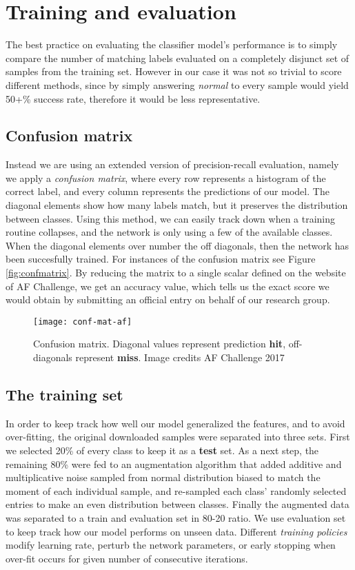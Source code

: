 \chapter{Training and evaluation}

The best practice on evaluating the classifier model's performance is to simply compare the number of matching labels evaluated on a completely disjunct set of samples from the training set.
However in our case it was not so trivial to score different methods, since by simply answering \textit{normal} to every sample would yield 50+\% success rate, therefore it would be less representative.

\section{Confusion matrix}
Instead we are using an extended version of precision-recall evaluation, namely we apply a \textit{confusion matrix}, where every row represents a histogram of the correct label, and every column represents the predictions of our model. The diagonal elements show how many labels match, but it preserves the distribution between classes.
Using this method, we can easily track down when a training routine collapses, and the network is only using a few of the available classes. When the diagonal elements over number the off diagonals, then the network has been succesfully trained. For instances of the confusion matrix see Figure \ref{fig:confmatrix}.
By reducing the matrix to a single scalar defined on the website of AF Challenge, we get an accuracy value, which tells us the exact score we would obtain by submitting an official entry on behalf of our research group.

\begin{figure}
  \centering
  \texttt{[image: conf-mat-af]}\label{fig:FCN}
  \caption{Confusion matrix. Diagonal values represent prediction \textbf{hit}, off-diagonals represent \textbf{miss}. Image credits AF Challenge 2017}
\end{figure}

\section{The training set}
In order to keep track how well our model generalized the features, and to avoid over-fitting, the original downloaded samples were separated into three sets.
First we selected 20\% of every class to keep it as a \textbf{test} set.
As a next step, the remaining 80\% were fed to an augmentation algorithm that added additive and multiplicative noise sampled from normal distribution biased to match the moment of each individual sample, and re-sampled each class' randomly selected entries to make an even distribution between classes.
Finally the augmented data was separated to a train and evaluation set in 80-20 ratio.
We use evaluation set to keep track how our model performs on unseen data.
Different \textit{training policies} modify learning rate, perturb the network parameters, or early stopping when over-fit occurs for given number of consecutive iterations.


